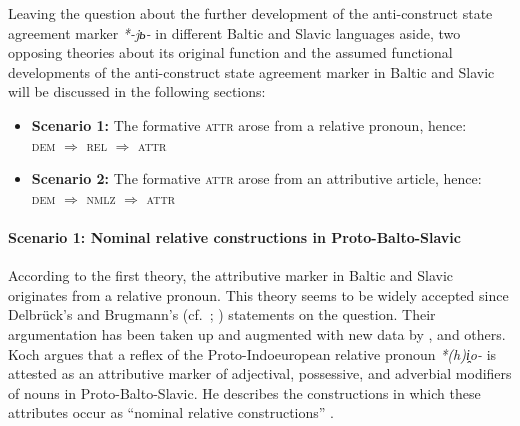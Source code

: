 Leaving the question about the further development of the anti-construct state agreement marker \textit{*-jь-} in different Baltic and Slavic languages aside, two opposing theories about its original function and the assumed functional developments of the anti-construct state agreement marker in Baltic and Slavic will be discussed in the following sections:
\begin{itemize}
\item \textbf{Scenario 1:} The formative \textsc{attr} arose from a relative pronoun, hence:\\
\textsc{dem $\Rightarrow$ rel $\Rightarrow$ attr}
\item \textbf{Scenario 2:} The formative \textsc{attr} arose from an attributive article, hence:\\
\textsc{dem $\Rightarrow$ nmlz $\Rightarrow$ attr}
\label{2paths}
\end{itemize}

\paragraph{Scenario 1: Nominal relative constructions in Proto-Balto-Slavic}
According to the first theory, the attributive marker in Baltic and Slavic originates from a relative pronoun. This theory seems to be widely accepted since Delbrück's and Brugmann's (cf.~\citealt[432–433]{delbruck1893}; \citealt[331, 344]{brugmann-etal1916}) statements on the question. Their argumentation has been taken up and augmented with new data by \citet{schmidt1959}, \citet{koch1992,koch1999} and others. Koch argues that a reflex of the Proto-Indoeuropean relative pronoun \textit{*(h)i̭o-} is attested as an attributive marker of adjectival, possessive, and adverbial modifiers of nouns in Proto-Balto-Slavic. He describes the constructions in which these attributes occur as “nominal relative constructions” \cite[470, elsewhere]{koch1999}.

